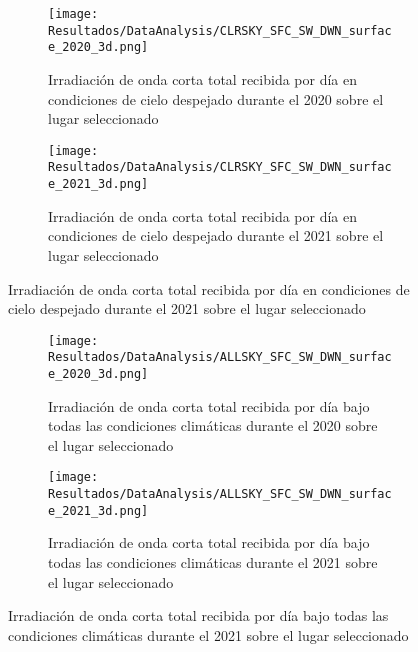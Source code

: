 			\begin{figure}[H]
				\centering
				\begin{subfigure}[t]{0.45\linewidth}
					\centering
					\texttt{[image: Resultados/DataAnalysis/CLRSKY\_SFC\_SW\_DWN\_surface\_2020\_3d.png]}
					\caption{Irradiación de onda corta total recibida por día en condiciones de cielo despejado durante el 2020 sobre el lugar seleccionado}
					\label{fig:CLRSKY_SFC_SW_DWN_surface_2020_3d}
				\end{subfigure}
				\hfill
				\begin{subfigure}[t]{0.45\linewidth}
					\centering
					\texttt{[image: Resultados/DataAnalysis/CLRSKY\_SFC\_SW\_DWN\_surface\_2021\_3d.png]}
					\caption{Irradiación de onda corta total recibida por día en condiciones de cielo despejado durante el 2021 sobre el lugar seleccionado}
					\label{fig:CLRSKY_SFC_SW_DWN_surface_2021_3d}
				\end{subfigure}
			\end{figure}
			
			\begin{figure}[H]\ContinuedFloat
				\begin{subfigure}[t]{0.45\linewidth}
					\centering
					\texttt{[image: Resultados/DataAnalysis/ALLSKY\_SFC\_SW\_DWN\_surface\_2020\_3d.png]}
					\caption{Irradiación de onda corta total recibida por día bajo todas las condiciones climáticas durante el 2020 sobre el lugar seleccionado}
					\label{fig:ALLSKY_SFC_SW_DWN_surface_2020_3d}
				\end{subfigure}
				\hfill
				\begin{subfigure}[t]{0.45\linewidth}
					\centering
					\texttt{[image: Resultados/DataAnalysis/ALLSKY\_SFC\_SW\_DWN\_surface\_2021\_3d.png]}
					\caption{Irradiación de onda corta total recibida por día bajo todas las condiciones climáticas durante el 2021 sobre el lugar seleccionado}
					\label{fig:ALLSKY_SFC_SW_DWN_surface_2021_3d}
				\end{subfigure}
			\end{figure}
			
